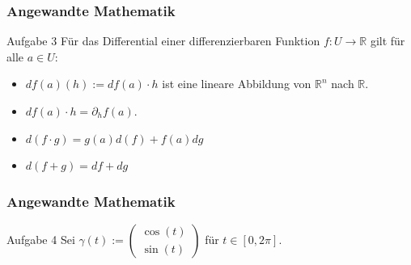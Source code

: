 \documentclass{beamer}
\begin{document}
\begin{frame}
    \frametitle{Angewandte Mathematik}
\begin{block}{Aufgabe 3}
Für das Differential einer differenzierbaren Funktion  $f: U \to \mathbb{R}$ gilt für alle $a \in U$:
\begin{itemize}
\item  $df(a) (h) :=  df(a) \cdot h$ ist eine lineare Abbildung von $\mathbb{R}^n$ nach $\mathbb{R}$.
\item $df(a)  \cdot h = \partial_h f(a)$. 
\item $d (f \cdot g) = g(a) d(f) + f(a) dg$
\item $d(f + g) = df + dg$
\end{itemize}
\end{block}
 \end{frame}


\begin{frame}
    \frametitle{Angewandte Mathematik}
\begin{block}{Aufgabe 4}
Sei $\gamma(t):= \begin{pmatrix} \cos(t) \\ \sin(t) \end{pmatrix}$ für $t \in [0, 2 \pi]$.
\end{block}
 \end{frame}
\end{document}

